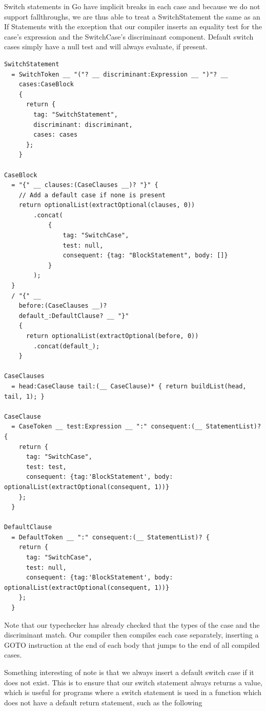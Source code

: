 \documentclass{report}
\begin{document}
Switch statements in Go have implicit breaks in each case and because we do not support fallthroughs, we are thus able to treat a SwitchStatement the same as an If Statements with the exception that our compiler inserts an equality test for the case's expression and the SwitchCase's discriminant component. Default switch cases simply have a null test and will always evaluate, if present.

\begin{verbatim}
SwitchStatement
  = SwitchToken __ "("? __ discriminant:Expression __ ")"? __
    cases:CaseBlock
    {
      return {
        tag: "SwitchStatement",
        discriminant: discriminant,
        cases: cases
      };
    }

CaseBlock
  = "{" __ clauses:(CaseClauses __)? "}" {
    // Add a default case if none is present
    return optionalList(extractOptional(clauses, 0))
        .concat(
            {
                tag: "SwitchCase",
                test: null,
                consequent: {tag: "BlockStatement", body: []}
            }
        );
  }
  / "{" __
    before:(CaseClauses __)?
    default_:DefaultClause? __ "}"
    {
      return optionalList(extractOptional(before, 0))
        .concat(default_);
    }

CaseClauses
  = head:CaseClause tail:(__ CaseClause)* { return buildList(head, tail, 1); }

CaseClause
  = CaseToken __ test:Expression __ ":" consequent:(__ StatementList)? {
    return {
      tag: "SwitchCase",
      test: test,
      consequent: {tag:'BlockStatement', body: optionalList(extractOptional(consequent, 1))}
    };
  }

DefaultClause
  = DefaultToken __ ":" consequent:(__ StatementList)? {
    return {
      tag: "SwitchCase",
      test: null,
      consequent: {tag:'BlockStatement', body: optionalList(extractOptional(consequent, 1))}
    };
  }
\end{verbatim}

Note that our typechecker has already checked that the types of the case and the discriminant match. Our compiler then compiles each case separately, inserting a GOTO instruction at the end of each body that jumps to the end of all compiled cases.

 Something interesting of note is that we always insert a default switch case if it does not exist. This is to ensure that our switch statement always returns a value, which is useful for programs where a switch statement is used in a function which does not have a default return statement, such as the following
\end{document}
